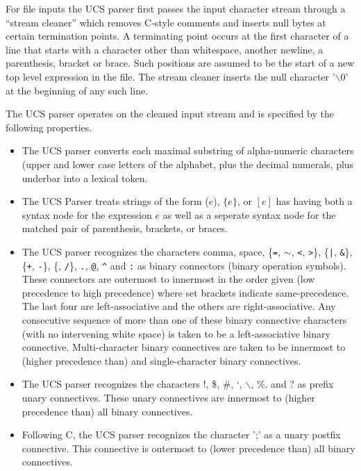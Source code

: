\documentclass{article}
\newcommand{\mtt}[1]{\mbox{\tt #1}}
\begin{document}
For file inputs the UCS parser first passes the input character stream through a ``stream cleaner'' which removes C-style comments  and inserts null bytes at certain termination points.
A terminating point occurs at the first character of a line that starts with a character other than whitespace, another newline, a parenthesis, bracket or brace.
Such positions are assumed to be the start of a new top level expression in the file.
The stream cleaner inserts the null character '$\backslash$0' at the beginning of any such line.

The UCS parser operates on the cleaned input stream and is specified by the following properties.

\begin{itemize}
\item The UCS parser converts each maximal substring of alpha-numeric characters (upper and lower case letters of the alphabet, plus the decimal numerals, plus underbar into a lexical token.

\item The UCS Parser treats strings of the form ($e$), $\{e\}$, or $[e]$ has having both a syntax node for the expression $e$ as well as a seperate syntax node
for the matched pair of parenthesis, brackets, or braces.

\item The UCS parser recognizes the characters comma, space,
  \{\mtt{=}, \mtt{$\sim$}, \mtt{<}, \mtt{>}\}, \{\mtt{|}, \mtt{\&}\}, \{\mtt{+}, \mtt{-}\}, \{\mtt{*}, \mtt{/}\}, \mtt{.}, \mtt{@}, \mtt{\^{}} and \mtt{:} as
binary connectors (binary operation symbols).
These connectors are outermost to innermost in the order given (low precedence to high precedence) where set brackets indicate same-precedence.
The last four are left-associative and the others are right-associative.
Any consecutive sequence of more than one of these binary connective characters (with no intervening white space) is taken to be a left-associative binary connective.
Multi-character binary connectives
are taken to be innermost to (higher precedence than) and single-character binary connectives.

\item The UCS parser recognizes the characters !, \$, \#, `, $\backslash$, \%, and ? as prefix unary connectives.  These unary connectives are innermost to (higher precedence than)
all binary connectives.

\item Following C, the UCS parser recognizes the character ';' as a unary postfix connective.  This connective is outermost to (lower precedence than) all binary connectives.


\end{itemize}
\end{document}
